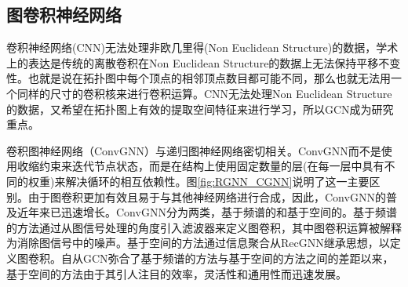 \subsection{图卷积神经网络}
卷积神经网络(CNN)无法处理非欧几里得(Non Euclidean Structure)的数据，学术上的表达是传统的离散卷积在Non Euclidean Structure的数据上无法保持平移不变性。也就是说在拓扑图中每个顶点的相邻顶点数目都可能不同，那么也就无法用一个同样的尺寸的卷积核来进行卷积运算。CNN无法处理Non Euclidean Structure的数据，又希望在拓扑图上有效的提取空间特征来进行学习，所以GCN成为研究重点。

卷积图神经网络（ConvGNN）与递归图神经网络密切相关。ConvGNN而不是使用收缩约束来迭代节点状态，而是在结构上使用固定数量的层(在每一层中具有不同的权重)来解决循环的相互依赖性。图\ref{fig:RGNN_CGNN}说明了这一主要区别。由于图卷积更加有效且易于与其他神经网络进行合成，因此，ConvGNN的普及近年来已迅速增长。ConvGNN分为两类，基于频谱的和基于空间的。基于频谱的方法通过从图信号处理的角度引入滤波器来定义图卷积，其中图卷积运算被解释为消除图信号中的噪声。基于空间的方法通过信息聚合从RecGNN继承思想，以定义图卷积。自从GCN弥合了基于频谱的方法与基于空间的方法之间的差距以来，基于空间的方法由于其引人注目的效率，灵活性和通用性而迅速发展。

